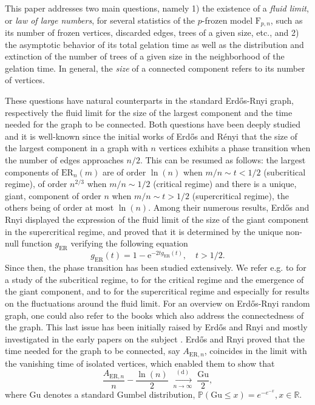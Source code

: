 \documentclass[a4, 11pt]{article}
\numberwithin{equation}{section}
\theoremstyle{plain}
\theoremstyle{definition}
\theoremstyle{remark}
\begin{document}
This paper addresses two main questions, namely 1) the existence of a \emph{fluid limit}, or \emph{law of large numbers}, for several statistics of the $p$-frozen model $\mathrm{F}_{p,n}$, such as its number of frozen vertices, discarded edges, trees of a given size, etc., and 2) the asymptotic behavior of its total gelation time as well as the distribution and extinction of the number of trees of a given size in the neighborhood of the gelation time. In general, the \emph{size} of a connected component refers to its number of vertices.

These questions have natural counterparts in the standard Erd\H{o}s-Rnyi graph, respectively the fluid limit for the size of the largest component and the time needed for the graph to be connected. Both questions have been deeply studied and it is well-known since the initial works of Erd\H{o}s and R\'enyi \cite{ErdosRenyi59,ErdosRenyi60} that the size of the largest component in a graph with $n$ vertices exhibits a phase transition when the number of edges approaches $n/2$. This can be resumed as follows: the largest components of $\mathrm{ER}_n(m)$  are of order $\ln(n)$ when $m/n\sim t<1/2$ (subcritical regime), of order $n^{2/3}$ when $m/n\sim 1/2$ (critical regime) and there is a unique, giant, component of order $n$ when $m/n\sim t>1/2$ (supercritical regime), the others being of order at most $\ln(n)$. Among their numerous results, Erd\H{o}s and Rnyi displayed the expression of the fluid limit of the size of the giant component in the supercritical regime, and proved that it is determined by the unique non-null function $g_{\mathrm{ER}}$ verifying the following equation
\begin{equation*}
	g_{\mathrm{ER}}(t)=1-\mathrm{e}^{-2tg_{\mathrm{ER}}(t)},\quad t>1/2.
\end{equation*}  
Since then, the phase transition has been studied extensively. We refer e.g. to \cite{Pittel88} for a study of the subcritical regime, to \cite{aldous97,JansonKnuthLuczakPittel93,luczak90} for the critical regime and the emergence of the giant component, and to \cite{barraezBoucheronVega00,pittel90,rath18,stepanov70} for the supercritical regime and especially for results on the fluctuations around the fluid limit. For an overview on Erd\H{o}s-Rnyi random graph, one could also refer to the books \cite{AlonSpencer16,bollobas01,vanderhofstad24} which also address the connectedness of the graph. This last issue has been initially raised by Erd\H{o}s and Rnyi \cite{ErdosRenyi59} and mostly investigated in the early papers on the subject \cite{ErdosRenyi59,ErdosRenyi60,stepanov70}. Erd\H{o}s and Rnyi proved that the time needed for the graph to be connected, say $A_{\mathrm{ER},n}$, coincides in the limit with the vanishing time of isolated vertices,  which enabled them to show that
\begin{equation}
\label{connec:ER}
	\frac{A_{\mathrm{ER},n}}{n}-\frac{\ln(n)}{2}  \; \underset{n \rightarrow \infty}{\overset{\mathrm{(d)}}\longrightarrow} \; \frac{\mathrm{Gu}}{2},
\end{equation}
where $\mathrm{Gu}$ denotes a standard Gumbel distribution, $\mathbb P(\mathrm{Gu}\leq x)=e^{-e^{-x}}, x \in \mathbb R$.
\end{document}
